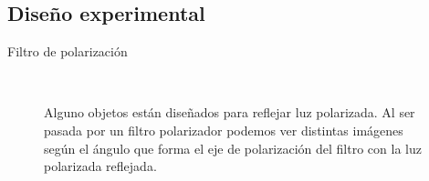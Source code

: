 \documentclass[]{presentation}
\begin{document}
\subsection{Diseño experimental}
\begin{frame}{Filtro de polarización}
\begin{figure}
	\centering
	\,
	\,
	\caption{\justifying Alguno objetos están diseñados para reflejar luz polarizada. Al ser pasada por un filtro polarizador podemos ver distintas imágenes según el ángulo que forma el eje de polarización del filtro con la luz polarizada reflejada.}
\end{figure}
\end{frame}
\end{document}
